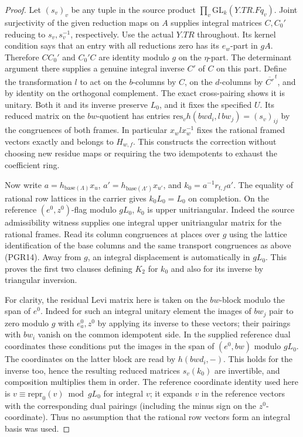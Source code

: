 \begin{proof}
Let \((s_v)_v\) be any tuple in the source product
\(\prod_v\mathrm{GL}_k(Y.TR.Fq_v)\). Joint surjectivity of the
given reduction maps on \(A\) supplies integral matrices \(C,C_0'\)
reducing to \(s_v,s_v^{-1}\), respectively. Use the actual
\(Y.TR\) throughout. Its kernel condition says that an entry with
all reductions zero has its \(e_w\)-part in \(gA\). Therefore
\(CC_0'\) and \(C_0'C\) are identity modulo \(g\) on the
\(\eta\)-part. The determinant argument there supplies a genuine
integral inverse \(C'\) of \(C\) on this part. Define the
transformation \(l\) to act on the \(b\)-columns by \(C\), on
the \(d\)-columns by \(\overline{C'}^{\,t}\), and by identity on
the orthogonal complement. The exact cross-pairing shows it is
unitary. Both it and its inverse preserve \(L_0\), and it fixes the
specified \(U\). Its reduced matrix on the \(bw\)-quotient has
entries \(\mathrm{res}_v h(bwd_i,l\,bw_j)=(s_v)_{ij}\) by the
congruences of both frames. In particular \(x_w l x_w^{-1}\) fixes
the rational framed vectors exactly and belongs to \(H_{w,f}\).
This constructs the correction without choosing new residue maps or
requiring the two idempotents to exhaust the coefficient ring.

Now write \(a=h_{\mathrm{base}(\Lambda)}x_u\),
\(a'=h_{\mathrm{base}(\Lambda')}x_{u'}\), and \(k_0=a^{-1}r_{t,f}a'\).
The equality of rational row lattices in the carrier gives
\(k_0L_0=L_0\) on completion. On the reference \((e^0,z^0)\)-flag
modulo \(gL_0\), \(k_0\) is upper unitriangular. Indeed the source
admissibility witness supplies one integral upper unitriangular
matrix for the rational frames. Read its column congruences at
places over \(g\) using the lattice identification of the base
columns and the same transport congruences as above (PGR14).
Away from \(g\), an integral displacement is automatically in
\(gL_0\). This proves the first two clauses defining \(K_2\) for
\(k_0\) and also for its inverse by triangular inversion.

For clarity, the residual Levi matrix here is taken on the
\(bw\)-block modulo the span of \(e^0\). Indeed for such an
integral unitary element the images of \(bw_j\) pair to zero modulo
\(g\) with \(e_a^0,z^0\) by applying its inverse to these vectors;
their pairings with \(bw_i\) vanish on the common idempotent side.
In the supplied reference dual coordinates these conditions put
the images in the span of \((e^0,bw)\) modulo \(gL_0\). The
coordinates on the latter block are read by \(h(bwd_i,-)\).
This holds for the inverse too, hence the resulting reduced
matrices \(s_v(k_0)\) are invertible, and composition multiplies
them in order. The reference coordinate identity used here is
\(v\equiv\mathrm{repr}_0(v)\bmod gL_0\) for integral \(v\);
it expands \(v\) in the reference vectors with the corresponding
dual pairings (including the minus sign on the \(z^0\)-coordinate).
Thus no assumption that the rational row vectors form an integral
basis was used.


\end{proof}
